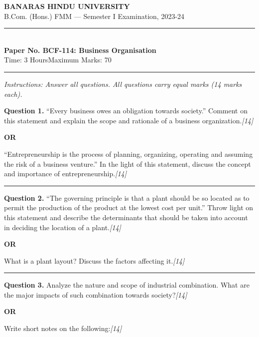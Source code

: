 \documentclass[11pt,a4paper]{article}
\newcommand{\pts}[1]{\hfill   \textit{[#1]}}
\begin{document}
\begin{center}
  {\large\bfseries BANARAS HINDU UNIVERSITY}\\[2pt]
  {\normalsize B.Com. (Hons.) FMM --- Semester I Examination, 2023-24}\\[6pt]
  \rule{0.8\linewidth}{0.5pt}\\[6pt]
  {\large\bfseries Paper No. BCF-114: Business Organisation}\\[4pt]
  {\normalsize Time: 3 Hours\hfill Maximum Marks: 70}
\end{center}

\rule{\linewidth}{0.4pt}

\smallskip



\noindent   \textit{Instructions: Answer all questions. All questions carry equal marks (14 marks each).}

\bigskip




\noindent   \textbf{Question 1.}
``Every business owes an obligation towards society.'' Comment on this statement and explain the scope and rationale of a business organization.\pts{14}

\centerline{   \textbf{OR}}

``Entrepreneurship is the process of planning, organizing, operating and assuming the risk of a business venture.'' In the light of this statement, discuss the concept and importance of entrepreneurship.\pts{14}

\medskip\rule{\linewidth}{0.2pt}




\noindent   \textbf{Question 2.}
``The governing principle is that a plant should be so located as to permit the production of the product at the lowest cost per unit.'' Throw light on this statement and describe the determinants that should be taken into account in deciding the location of a plant.\pts{14}

\centerline{   \textbf{OR}}

What is a plant layout? Discuss the factors affecting it.\pts{14}

\medskip\rule{\linewidth}{0.2pt}




\noindent   \textbf{Question 3.}
Analyze the nature and scope of industrial combination. What are the major impacts of such combination towards society?\pts{14}

\centerline{   \textbf{OR}}

Write short notes on the following:\pts{14}
\end{document}

